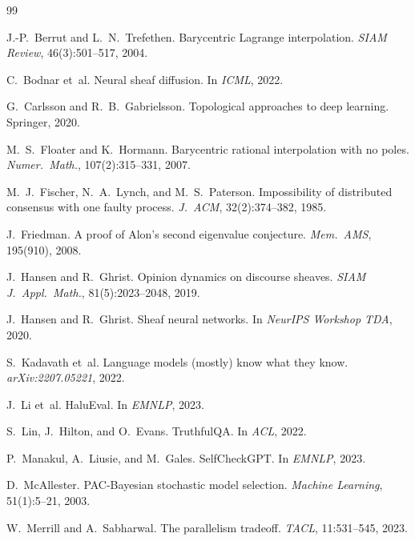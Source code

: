 \documentclass[11pt,a4paper]{article}
\theoremstyle{plain}
\theoremstyle{definition}
\theoremstyle{remark}
\begin{document}

\begin{thebibliography}{99}

J.-P.~Berrut and L.~N.~Trefethen. Barycentric {L}agrange interpolation. \emph{SIAM Review}, 46(3):501--517, 2004.

C.~Bodnar et~al. Neural sheaf diffusion. In \emph{ICML}, 2022.

G.~Carlsson and R.~B.~Gabrielsson. Topological approaches to deep learning. Springer, 2020.

M.~S.~Floater and K.~Hormann. Barycentric rational interpolation with no poles. \emph{Numer.\ Math.}, 107(2):315--331, 2007.

M.~J.~Fischer, N.~A.~Lynch, and M.~S.~Paterson. Impossibility of distributed consensus with one faulty process. \emph{J.~ACM}, 32(2):374--382, 1985.

J.~Friedman. A proof of {A}lon's second eigenvalue conjecture. \emph{Mem.\ AMS}, 195(910), 2008.

J.~Hansen and R.~Ghrist. Opinion dynamics on discourse sheaves. \emph{SIAM J.\ Appl.\ Math.}, 81(5):2023--2048, 2019.

J.~Hansen and R.~Ghrist. Sheaf neural networks. In \emph{NeurIPS Workshop TDA}, 2020.

S.~Kadavath et~al. Language models (mostly) know what they know. \emph{arXiv:2207.05221}, 2022.

J.~Li et~al. {HaluEval}. In \emph{EMNLP}, 2023.

S.~Lin, J.~Hilton, and O.~Evans. {TruthfulQA}. In \emph{ACL}, 2022.

P.~Manakul, A.~Liusie, and M.~Gales. {SelfCheckGPT}. In \emph{EMNLP}, 2023.

D.~McAllester. {PAC-Bayesian} stochastic model selection. \emph{Machine Learning}, 51(1):5--21, 2003.

W.~Merrill and A.~Sabharwal. The parallelism tradeoff. \emph{TACL}, 11:531--545, 2023.


\end{thebibliography}
\end{document}
